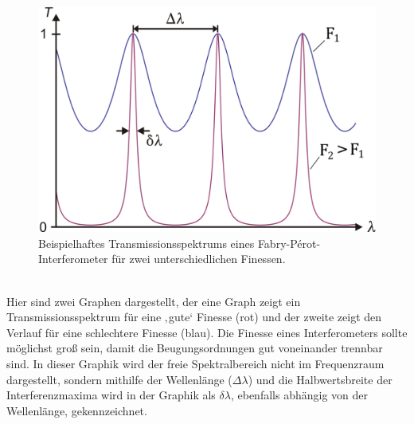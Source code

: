 \begin{figure}[h]
    \centering
    \includegraphics[scale=0.2]{Bilder/FzV/FPI2.png}
    \caption{Beispielhaftes Transmissionsspektrums eines Fabry-Pérot-Interferometer für zwei unterschiedlichen Finessen.}
\end{figure}\\
Hier sind zwei Graphen 
dargestellt, der eine Graph zeigt ein Transmissionsspektrum für eine ‚gute‘ Finesse (rot) 
und der zweite zeigt den Verlauf für eine schlechtere Finesse (blau). 
Die Finesse eines Interferometers sollte möglichst groß sein, damit die Beugungsordnungen gut voneinander trennbar sind. 
In dieser Graphik wird der freie Spektralbereich nicht im Frequenzraum dargestellt, sondern mithilfe der Wellenlänge ($\Delta \lambda$) 
und die Halbwertsbreite der Interferenzmaxima wird in der Graphik als $\delta \lambda$, 
ebenfalls abhängig von der Wellenlänge, gekennzeichnet. \citep[vgl.][]{fpi1}
